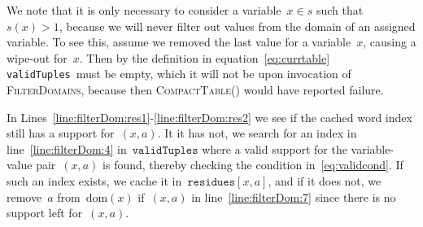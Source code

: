 \documentclass[a4paper,11pt]{article}
\newcommand{\Lineref}[1]{Line~\ref{#1}}
\newcommand{\Linesref}[2]{Lines~\ref{#1}-\ref{#2}}
\newcommand{\Dom}[1]{\text{dom}({#1})}
\newcommand{\SparseBitSet}{\texttt{SparseBitSet}}
\newcommand{\Scp}{\texttt{vars}}
\newcommand{\CurrTable}{\texttt{validTuples}}
\newcommand{\Residues}{\texttt{residues}}
\def\CompactTable{\textsc{CompactTable}}
\def\FilterDomains{\textsc{FilterDomains}}
\numberwithin{equation}{section}
\begin{document}
  
  We note that it is only necessary to
  consider a variable~$x \in s$ such that~$s(x) > 1$,
  because we will never filter out values from the domain of an assigned
  variable. To see this, assume we removed the last value for a variable~$x$,
  causing a wipe-out for~$x$. Then by the definition in equation~\eqref{eq:currtable}
  \CurrTable~must be empty,
  which it will not be upon invocation of \FilterDomains, because then
  \CompactTable() would have reported failure. 

  In \Linesref{line:filterDom:res1}{line:filterDom:res2} we see if the
  cached word index still has a support for~$(x,a)$. It it has not,
  we search for an index in line~\ref{line:filterDom:4} in~$\CurrTable$
  where a valid support for the variable-value pair~$(x,a)$ is found, 
  thereby checking the condition in~\eqref{eq:validcond}.
  If such an index exists, we cache it in~$\Residues[x,a]$, and
  if it does not, we remove~$a$ from~$\Dom{x}$ if~$(x,a)$ in 
  line~\ref{line:filterDom:7} since there is no support left for~$(x,a)$.




\clearpage





\end{document}
